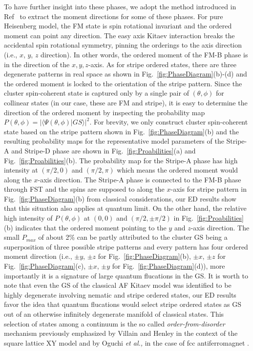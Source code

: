 \documentclass[aps,prb,reprint,amsfonts,amsmath,amssymb,showpacs,groupedaddress,superscriptaddress]{revtex4-1}
\begin{document}
To have further insight into these phases, we adopt the method introduced in Ref~ to extract the moment directions for some of these phases. For pure Heisenberg model, the FM state is spin rotational invariant and the ordered moment can point any direction. The easy axis Kitaev interaction breaks the accidental spin rotational symmetry, pinning the orderings to the axis direction (i.e., $x$, $y$, $z$ direction). In other words, the ordered moment of the FM-B phase is in the direction of the $x,y,z$-axis. As for stripe ordered states, there are three degenerate patterns in real space as shown in Fig.~\ref{fig:PhaseDiagram}(b)-(d) and the ordered moment is locked to the orientation of the stripe pattern. Since the cluster spin-coherent state is captured only by a single pair of $(\theta, \phi)$ for collinear states (in our case, these are FM and stripe), it is easy to determine the direction of the ordered moment by inspecting the probability map $P(\theta, \phi) = | \langle \Psi (\theta, \phi) | GS \rangle |^2$. For brevity, we only construct cluster spin-coherent state based on the stripe pattern shown in Fig.~\ref{fig:PhaseDiagram}(b) and the resulting probability maps for the representative model parameters of the Stripe-A and Stripe-D phase are shown in Fig.~\ref{fig:Proabilities}(a) and Fig.~\ref{fig:Proabilities}(b). The probability map for the Stripe-A phase has high intensity at $(\pi/2, 0)$ and $(\pi/2, \pi)$ which means the ordered moment would along the $x$-axis direction. The Stripe-A phase is connected to the FM-B phase through FST and the spins are supposed to along the $x$-axis for stripe pattern in Fig.~\ref{fig:PhaseDiagram}(b) from classical considerations, our ED results show that this situation also applies at quantum limit. On the other hand, the relative high intensity of $P(\theta, \phi)$ at $(0, 0)$ and $(\pi/2, \pm\pi/2)$ in Fig.~\ref{fig:Proabilities}(b) indicates that the ordered moment pointing to the $y$ and $z$-axis direction. The small $P_{max}$ of about 2\% can be partly attributed to the cluster GS being a superposition of three possible stripe patterns and every pattern has four ordered moment direction (i.e., $\pm y$, $\pm z$ for Fig.~\ref{fig:PhaseDiagram}(b), $\pm x$, $\pm z$ for Fig.~\ref{fig:PhaseDiagram}(c), $\pm x$, $\pm y$ for Fig.~\ref{fig:PhaseDiagram}(d)), more importantly it is a signature of large quantum flucations in the GS. It is worth to note that even the GS of the classical AF Kitaev model was identified to be highly degenerate involving nematic and stripe ordered states, our ED results favor the idea that quantum flucations would select stripe ordered states as GS out of an otherwise infinitely degenerate manifold of classical states. This selection of states among a continuum is the so called \emph{order-from-disorder} mechanism previously emphasized by Villain and Henley in the context of the square lattice XY model \cite{PhysRevLett.62.2056} and by Oguchi \emph{et al.,} in the case of fcc antiferromagnet \cite{JPSJ.54.4494}.
\end{document}
